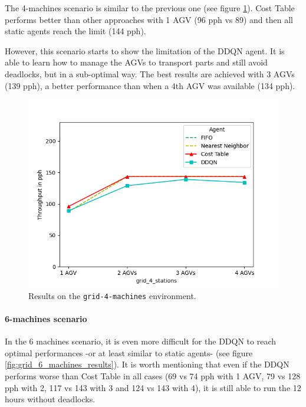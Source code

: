 \documentclass[sn-mathphys]{sn-jnl}
\begin{document}
The 4-machines scenario is similar to the previous one (see figure \ref{fig:grid_4_machines_results}). Cost Table performs better than other approaches with 1 AGV (96 pph vs 89) and then all static agents reach the limit (144 pph). 

However, this scenario starts to show the limitation of the DDQN agent. It is able to learn how to manage the AGVs to transport parts and still avoid deadlocks, but in a sub-optimal way. The best results are achieved with 3 AGVs (139 pph), a better performance than when a 4th AGV was available (134 pph). 

\begin{figure}[ht]
  \includegraphics[width=1.0\textwidth]{results_grid_4_machines.png}
  \caption{Results on the \texttt{grid-4-machines} environment.}
  \label{fig:grid_4_machines_results}
\end{figure}

\paragraph{6-machines scenario}

In the 6 machines scenario, it is even more difficult for the DDQN to reach optimal performances -or at least similar to static agents- (see figure \ref{fig:grid_6_machines_results}). It is worth mentioning that even if the DDQN performs worse than Cost Table in all cases (69 vs 74 pph with 1 AGV, 79 vs 128 pph with 2, 117 vs 143 with 3 and 124 vs 143 with 4), it is still able to run the 12 hours without deadlocks.
\end{document}
